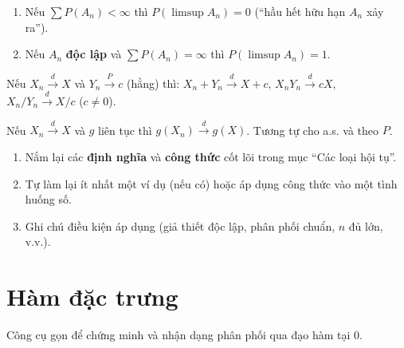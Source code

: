 \documentclass[12pt,a4paper]{article}
\begin{document}
\begin{dinhly}[title={Bổ đề Borel--Cantelli}]
  \begin{enumerate}
    \item Nếu $\sum P(A_n) < \infty$ thì $P(\limsup A_n) = 0$ (``hầu hết hữu hạn $A_n$ xảy ra'').
    \item Nếu $A_n$ \textbf{độc lập} và $\sum P(A_n) = \infty$ thì $P(\limsup A_n) = 1$.
  \end{enumerate}
\end{dinhly}

\begin{dinhly}[title={Định lý Slutsky}]
  Nếu $X_n \xrightarrow{d} X$ và $Y_n \xrightarrow{P} c$ (hằng) thì:
  $X_n + Y_n \xrightarrow{d} X + c$, \;$X_n Y_n \xrightarrow{d} cX$, \;$X_n/Y_n \xrightarrow{d} X/c$ ($c \ne 0$).
\end{dinhly}

\begin{dinhly}[title={Định lý ánh xạ liên tục (Continuous Mapping)}]
  Nếu $X_n \xrightarrow{d} X$ và $g$ liên tục thì $g(X_n) \xrightarrow{d} g(X)$. Tương tự cho a.s. và theo $P$.
\end{dinhly}


\begin{tongket}[title={Tổng kết: Các loại hội tụ}]
\begin{enumerate}
  \item Nắm lại các \textbf{định nghĩa} và \textbf{công thức} cốt lõi trong mục ``Các loại hội tụ''.
  \item Tự làm lại ít nhất một ví dụ (nếu có) hoặc áp dụng công thức vào một tình huống số.
  \item Ghi chú điều kiện áp dụng (giả thiết độc lập, phân phối chuẩn, $n$ đủ lớn, v.v.).
\end{enumerate}
\end{tongket}

\section{Hàm đặc trưng}

\begin{dongco}[title={Động cơ --- Hàm đặc trưng}]
Công cụ gọn để chứng minh và nhận dạng phân phối qua đạo hàm tại $0$.
\end{dongco}
\end{document}

